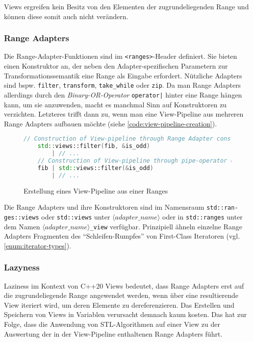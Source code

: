 \documentclass[runningheads]{llncs}
\begin{document}
Views ergreifen kein Besitz von den Elementen der zugrundeliegenden Range und können diese somit auch nicht verändern.

\subsubsection{Range Adapters}

Die Range-Adapter-Funktionen sind im \texttt{<ranges>}-Header definiert.
Sie bieten einen Konstruktor an, der neben den Adapter-spezifischen Parametern zur Transformationssemantik eine Range als Eingabe erfordert.
Nützliche Adapters sind bspw. \texttt{filter}, \texttt{transform}, \texttt{take\_while} oder \texttt{zip}.
Da man Range Adapters allerdings durch den \textit{Binary-OR-Operator} \texttt{operator|} hinter eine Range hängen kann, um sie anzuwenden, macht es manchmal Sinn auf Konstruktoren zu verzichten.
Letzteres trifft dann zu, wenn man eine View-Pipeline aus mehreren Range Adapters aufbauen möchte (siehe \autoref{code:view-pipeline-creation}).

\begin{figure}[H]
	\caption{Erstellung eines View-Pipeline aus einer Ranges}
	\label{code:view-pipeline-creation}
	\begin{lstlisting}[language=C++]
	// Construction of View-pipeline through Range Adapter constructor
	std::views::filter(fib, &is_odd)
		| // ...
	// Construction of View-pipeline through pipe-operator chaining
	fib | std::views::filter(&is_odd)
		| // ...
	\end{lstlisting}
\end{figure}

\noindent Die Range Adapters und ihre Konstruktoren sind im Namensraum \texttt{std::ran-ges::views} oder \texttt{std::views} unter \texttt{$\langle adapter\_name\rangle$} oder in \texttt{std::ranges} unter dem Namen \texttt{$\langle adapter\_name\rangle$\_view} verfügbar.
Prinzipiell ähneln einzelne Range Adapters Fragmenten des \enquote{Schleifen-Rumpfes} von First-Class Iteratoren (vgl. \ref{enum:iterator-types}).

\subsubsection{Lazyness}

Laziness im Kontext von C++20 Views bedeutet, dass Range Adapters erst auf die zugrundeliegende Range angewendet werden, wenn über eine resultierende View iteriert wird, um deren Elemente zu dereferenzieren.
Das Erstellen und Speichern von Views in Variablen verursacht demnach kaum kosten.
Das hat zur Folge, dass die Anwendung von STL-Algorithmen auf einer View zu der Auswertung der in der View-Pipeline enthaltenen Range Adapters führt.
\end{document}
